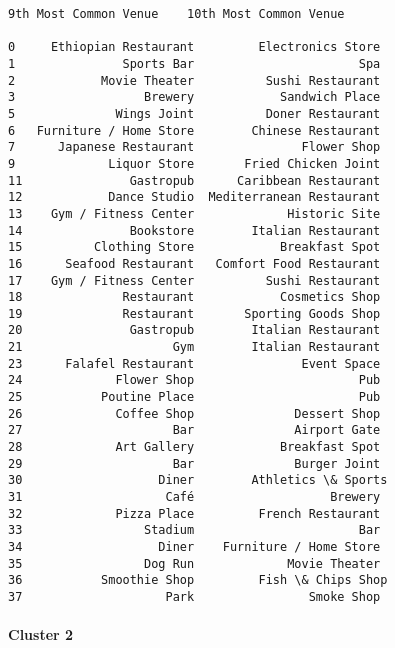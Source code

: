 \documentclass[11pt]{article}
\begin{document}
\begin{tcolorbox}[breakable, size=fbox, boxrule=.5pt, pad at break*=1mm, opacityfill=0]
\begin{Verbatim}[commandchars=\\\{\}]
     9th Most Common Venue    10th Most Common Venue

0     Ethiopian Restaurant         Electronics Store
1               Sports Bar                       Spa
2            Movie Theater          Sushi Restaurant
3                  Brewery            Sandwich Place
5              Wings Joint          Doner Restaurant
6   Furniture / Home Store        Chinese Restaurant
7      Japanese Restaurant               Flower Shop
9             Liquor Store       Fried Chicken Joint
11               Gastropub      Caribbean Restaurant
12            Dance Studio  Mediterranean Restaurant
13    Gym / Fitness Center             Historic Site
14               Bookstore        Italian Restaurant
15          Clothing Store            Breakfast Spot
16      Seafood Restaurant   Comfort Food Restaurant
17    Gym / Fitness Center          Sushi Restaurant
18              Restaurant            Cosmetics Shop
19              Restaurant       Sporting Goods Shop
20               Gastropub        Italian Restaurant
21                     Gym        Italian Restaurant
23      Falafel Restaurant               Event Space
24             Flower Shop                       Pub
25           Poutine Place                       Pub
26             Coffee Shop              Dessert Shop
27                     Bar              Airport Gate
28             Art Gallery            Breakfast Spot
29                     Bar              Burger Joint
30                   Diner        Athletics \& Sports
31                    Café                   Brewery
32             Pizza Place         French Restaurant
33                 Stadium                       Bar
34                   Diner    Furniture / Home Store
35                 Dog Run             Movie Theater
36           Smoothie Shop         Fish \& Chips Shop
37                    Park                Smoke Shop
\end{Verbatim}
\end{tcolorbox}
        
    \hypertarget{cluster-2}{%
\paragraph{Cluster 2}\label{cluster-2}}
\end{document}
